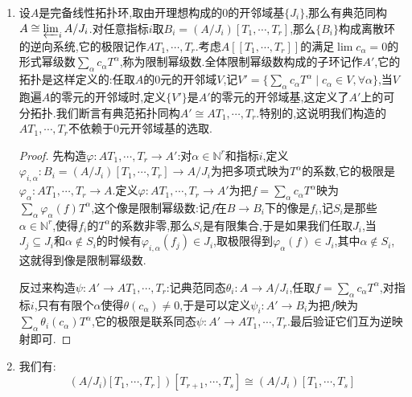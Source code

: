 \begin{enumerate}
	\item 设$A$是完备线性拓扑环,取由开理想构成的0的开邻域基$\{J_i\}$,那么有典范同构$A\cong\varprojlim_iA/J_i$.对任意指标$i$取$B_i=(A/J_i)[T_1,\cdots,T_r]$,那么$\{B_i\}$构成离散环的逆向系统,它的极限记作$A{T_1,\cdots,T_r}$.考虑$A[[T_1,\cdots,T_r]]$的满足$\lim c_{\alpha}=0$的形式幂级数$\sum_{\alpha}c_{\alpha}T^{\alpha}$,称为限制幂级数.全体限制幂级数构成的子环记作$A'$,它的拓扑是这样定义的:任取$A$的0元的开邻域$V$,记$V'=\{\sum_{\alpha}c_{\alpha}T^{\alpha}\mid c_{\alpha}\in V,\forall\alpha\}$,当$V$跑遍$A$的零元的开邻域时,定义$\{V'\}$是$A'$的零元的开邻域基,这定义了$A'$上的可分拓扑.我们断言有典范拓扑同构$A'\cong A{T_1,\cdots,T_r}$.特别的,这说明我们构造的$A{T_1,\cdots,T_r}$不依赖于0元开邻域基的选取.
    \begin{proof}
    	
    	先构造$\varphi:A{T_1,\cdots,T_r}\to A'$:对$\alpha\in\mathbb{N}^r$和指标$i$,定义$\varphi_{i,\alpha}:B_i=(A/J_i)[T_1,\cdots,T_r]\to A/J_i$为把多项式映为$T^{\alpha}$的系数,它的极限是$\varphi_{\alpha}:A{T_1,\cdots,T_r}\to A$.定义$\varphi:A{T_1,\cdots,T_r}\to A'$为把$f=\sum_{\alpha}c_{\alpha}T^{\alpha}$映为$\sum_{\alpha}\varphi_{\alpha}(f)T^{\alpha}$,这个像是限制幂级数:记$f$在$B\to B_i$下的像是$f_i$,记$S_i$是那些$\alpha\in\mathbb{N}^r$,使得$f_i$的$T^{\alpha}$的系数非零,那么$S_i$是有限集合,于是如果我们任取$J_i$,当$J_j\subseteq J_i$和$\alpha\not\in S_i$的时候有$\varphi_{i,\alpha}(f_j)\in J_i$,取极限得到$\varphi_{\alpha}(f)\in J_i$,其中$\alpha\not\in S_i$,这就得到像是限制幂级数.
    	
    	\qquad
    	
    	反过来构造$\psi:A'\to A{T_1,\cdots,T_r}$:记典范同态$\theta_i:A\to A/J_i$,任取$f=\sum_{\alpha}c_{\alpha}T^{\alpha}$,对指标$i$,只有有限个$\alpha$使得$\theta(c_{\alpha})\not=0$,于是可以定义$\psi_i:A'\to B_i$为把$f$映为$\sum_{\alpha}\theta_i(c_{\alpha})T^{\alpha}$,它的极限是联系同态$\psi:A'\to A{T_1,\cdots,T_r}$.最后验证它们互为逆映射即可.
    \end{proof}
    \item 我们有:
    $$\left(A/J_i)[T_1,\cdots,T_r]\right)[T_{r+1},\cdots,T_s]\cong(A/J_i)[T_1,\cdots,T_s]$$
    

\end{enumerate}
